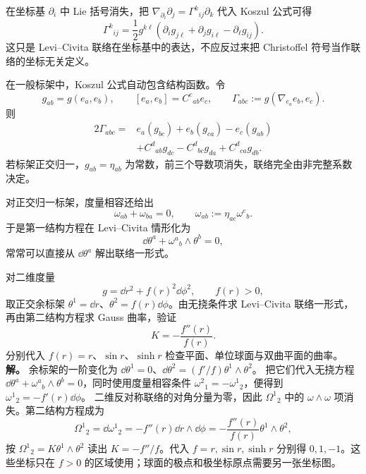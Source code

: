 在坐标基 $\partial_i$ 中 Lie 括号消失，把
$\nabla_{\partial_i}\partial_j=\Gamma^k{}_{ij}\partial_k$ 代入 Koszul 公式可得
\begin{equation*}\boxed{
\Gamma^k{}_{ij}
=\frac12g^{k\ell}
\left(
\partial_i g_{j\ell}
+\partial_j g_{i\ell}
-\partial_\ell g_{ij}
\right).}
\end{equation*}
这只是 Levi--Civita 联络在坐标基中的表达，不应反过来把 Christoffel 符号当作联络的坐标无关定义。

在一般标架中，Koszul 公式自动包含结构函数。令
\[
g_{ab}=g(e_a,e_b),
\qquad
[e_a,e_b]=C^c{}_{ab}e_c,
\qquad
\Gamma_{abc}:=g(\nabla_{e_a}e_b,e_c).
\]
则
\begin{equation*}\begin{aligned}
2\Gamma_{abc}
={}&e_a(g_{bc})+e_b(g_{ca})-e_c(g_{ab})\\
&+C^d{}_{ab}g_{dc}-C^d{}_{bc}g_{da}+C^d{}_{ca}g_{db}.
\end{aligned}
\end{equation*}
若标架正交归一，$g_{ab}=\eta_{ab}$ 为常数，前三个导数项消失，联络完全由非完整系数决定。

对正交归一标架，度量相容还给出
\begin{equation}\label{eq:math-dg-orthonormal-connection-skew}
\omega_{ab}+\omega_{ba}=0,
\qquad
\omega_{ab}:=\eta_{ac}\omega^c{}_b.
\end{equation}
于是第一结构方程在 Levi--Civita 情形化为
\[
\dd\theta^a+\omega^a{}_b\wedge\theta^b=0,
\]
常常可以直接从 $\dd\theta^a$ 解出联络一形式。


\par
\begin{workedexample}[旋转对称曲面的联络与曲率]
对二维度量
\[
g=\dd r^2+f(r)^2\dd\phi^2,
\qquad f(r)>0,
\]
取正交余标架 \(\theta^1=\dd r\)、\(\theta^2=f(r)\dd\phi\)。由无挠条件求 Levi--Civita 联络一形式，再由第二结构方程求 Gauss 曲率，验证
\[
K=-\frac{f''(r)}{f(r)}.
\]
分别代入 \(f(r)=r\)、\(\sin r\)、\(\sinh r\) 检查平面、单位球面与双曲平面的曲率。
\textbf{解。} 余标架的一阶变化为 \(\dd\theta^1=0\)、\(\dd\theta^2=(f'/f)\theta^1\wedge\theta^2\)。
把它们代入无挠方程 \(\dd\theta^a+\omega^a{}_b\wedge\theta^b=0\)，同时使用度量相容条件 \(\omega^2{}_1=-\omega^1{}_2\)，便得到 \(\omega^1{}_2=-f'(r)\dd\phi\)。
二维反对称联络的对角分量为零，因此 \(\Omega^1{}_2\) 中的 \(\omega\wedge\omega\) 项消失。第二结构方程成为
\[
\Omega^1{}_2=\dd\omega^1{}_2=-f''(r)\dd r\wedge\dd\phi
=-\frac{f''(r)}{f(r)}\theta^1\wedge\theta^2,
\]
按 \(\Omega^1{}_2=K\theta^1\wedge\theta^2\) 读出 \(K=-f''/f\)。代入 \(f=r,\sin r,\sinh r\) 分别得 \(0,1,-1\)。这些坐标只在 \(f>0\) 的区域使用；球面的极点和极坐标原点需要另一张坐标图。
\end{workedexample}
\par

